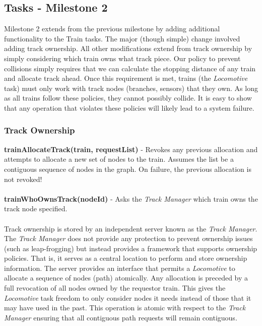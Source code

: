 \documentclass[twoside,a4paper]{refart}
\begin{document}
\subsection{Tasks - Milestone 2}
Milestone 2 extends from the previous milestone by adding additional functionality to the Train tasks. The major (though simple) change involved adding track ownership. All other modifications extend from track ownership by simply considering which train owns what track piece. Our policy to prevent collisions simply requires that we can calculate the stopping distance of any train and allocate track ahead. Once this requirement is met, trains (the \textit{Locomotive} task) must only work with track nodes (branches, sensors) that they own. As long as all trains follow these policies, they cannot possibly collide. It is easy to show that any operation that violates these policies will likely lead to a system failure.

\subsubsection{Track Ownership}

\textbf{trainAllocateTrack(train, requestList)} - Revokes any previous allocation and attempts to allocate a new set of nodes to the train. Assumes the list be a contiguous sequence of nodes in the graph. On failure, the previous allocation is not revoked! \\\\
\textbf{trainWhoOwnsTrack(nodeId)} - Asks the \textit{Track Manager} which train owns the track node specified. \\\\

Track ownership is stored by an independent server known as the \textit{Track Manager}. The \textit{Track Manager} does not provide any protection to prevent ownership issues (such as leap-frogging) but instead provides a framework that supports ownership policies. That is, it serves as a central location to perform and store ownership information. The server provides an interface that permits a \textit{Locomotive} to allocate a sequence of nodes (path) atomically. Any allocation is preceded by a full revocation of all nodes owned by the requestor train. This gives the \textit{Locomotive} task freedom to only consider nodes it needs instead of those that it may have used in the past. This operation is atomic with respect to the \textit{Track Manager} ensuring that all contiguous path requests will remain contiguous.
\end{document}
